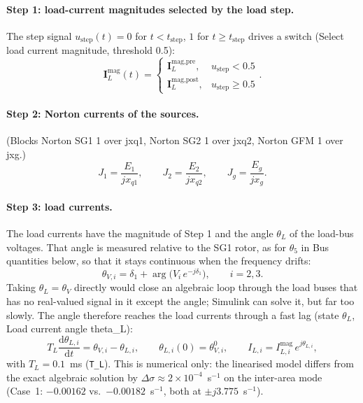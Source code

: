 \documentclass[11pt,a4paper]{article}
\numberwithin{equation}{section}
\newcommand{\dd}{\mathrm{d}}
\newcommand{\blk}[1]{\textsf{#1}}
\begin{document}
\paragraph{Step 1: load-current magnitudes selected by the load step.}
The step signal $u_{\text{step}}(t) = 0$ for $t<t_{\text{step}}$, $1$ for $t\ge t_{\text{step}}$ drives a switch (\blk{Select load current magnitude}, threshold 0.5):
\begin{equation}
\bm I_L^{\text{mag}}(t) = \begin{cases}\bm I_L^{\text{mag,pre}}, & u_{\text{step}}<0.5\\ \bm I_L^{\text{mag,post}}, & u_{\text{step}}\ge 0.5\end{cases}.
\end{equation}

\paragraph{Step 2: Norton currents of the sources.}
(Blocks \blk{Norton SG1 1 over jxq1}, \blk{Norton SG2 1 over jxq2}, \blk{Norton GFM 1 over jxg}.)
\begin{equation}
J_1 = \frac{E_1}{jx_{q1}},\qquad J_2 = \frac{E_2}{jx_{q2}},\qquad J_g = \frac{E_g}{jx_g}.
\end{equation}

\paragraph{Step 3: load currents.}
The load currents have the magnitude of Step 1 and the angle $\theta_L$ of the load-bus voltages. That angle is measured relative to the SG1 rotor, as for $\theta_5$ in \blk{Bus quantities} below, so that it stays continuous when the frequency drifts:
\begin{equation}
\theta_{V,i} = \delta_1 + \arg\!\big(V_i\,e^{-j\delta_1}\big),\qquad i = 2,3 .
\end{equation}
Taking $\theta_L = \theta_V$ directly would close an algebraic loop through the load buses that has no real-valued signal in it except the angle; Simulink can solve it, but far too slowly. The angle therefore reaches the load currents through a fast lag (state $\theta_L$, \blk{Load current angle theta\_L}):
\begin{equation}
\boxed{T_L\frac{\dd\theta_{L,i}}{\dd t} = \theta_{V,i} - \theta_{L,i},\qquad \theta_{L,i}(0) = \theta_{V,i}^0,\qquad
I_{L,i} = I_{L,i}^{\text{mag}}\,e^{j\theta_{L,i}},}
\end{equation}
with $T_L = 0.1$~ms (\texttt{T\_L}). This is numerical only: the linearised model differs from the exact algebraic solution by $\Delta\sigma \approx 2\times10^{-4}$~s$^{-1}$ on the inter-area mode (Case~1: $-0.00162$ vs.\ $-0.00182$~s$^{-1}$, both at $\pm j3.775$~s$^{-1}$).
\end{document}
